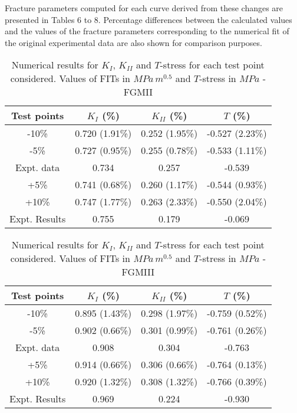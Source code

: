 Fracture parameters computed for each curve derived from these changes are presented in Tables 6 to 8. Percentage differences between the calculated values and the values of the fracture parameters corresponding to the numerical fit of the original experimental data are also shown for comparison purposes.

\begin{table*}[bp]
\caption{Numerical results for $K_I$, $K_{II}$ and $T$-stress for each test point considered. Values of FITs in $M\!Pa\,m^{0.5}$ and $T$-stress in $M\!Pa$ - FGMII}
\centering
\begin{tabular}{c c c c} 
\hline \hline
Test points & $K_I$ (\%) & $K_{II}$ (\%) & $T$ (\%) \\
 \hline
 -10\% & 0.720 (1.91\%)& 0.252 (1.95\%)& -0.527 (2.23\%)\\
 -5\% & 0.727 (0.95\%)& 0.255 (0.78\%)& -0.533 (1.11\%)\\
 Expt. data & 0.734 & 0.257 & -0.539 \\
 +5\% & 0.741 (0.68\%)& 0.260 (1.17\%)& -0.544 (0.93\%)\\
 +10\% & 0.747 (1.77\%)& 0.263 (2.33\%)& -0.550 (2.04\%)\\
 \hline
 Expt. Results & 0.755 & 0.179 & -0.069\\
 \hline \hline 
\end{tabular}
\label{tab:Table7}
\end{table*}

\begin{table*}[htbp]
\caption{Numerical results for $K_I$, $K_{II}$ and $T$-stress for each test point considered. Values of FITs in $M\!Pa\,m^{0.5}$ and $T$-stress in $M\!Pa$ - FGMIII}
\centering
\begin{tabular}{c c c c} 
\hline \hline
Test points & $K_I$ (\%) & $K_{II}$ (\%) & $T$ (\%) \\
 \hline
 -10\% & 0.895 (1.43\%)& 0.298 (1.97\%)& -0.759 (0.52\%)\\
 -5\% & 0.902 (0.66\%)& 0.301 (0.99\%)& -0.761 (0.26\%)\\
 Expt. data & 0.908 & 0.304 & -0.763\\
 +5\% & 0.914 (0.66\%)& 0.306 (0.66\%)& -0.764 (0.13\%)\\
 +10\% & 0.920 (1.32\%)& 0.308 (1.32\%)& -0.766 (0.39\%)\\
 \hline
 Expt. Results & 0.969 & 0.224 & -0.930\\
 \hline \hline 
\end{tabular}
\label{tab:Table8}
\end{table*}

